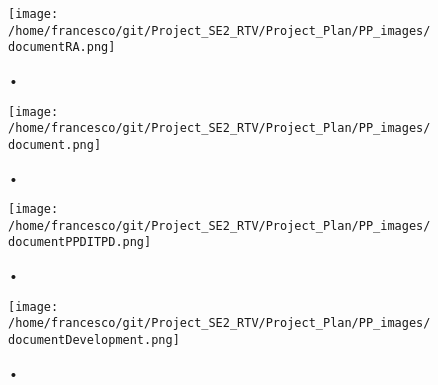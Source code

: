 \documentclass[10pt, a4paper,titlepage]{article}
\begin{document}
\pagebreak
\begin{figure}[h]
\begin{center}
\texttt{[image: /home/francesco/git/Project\_SE2\_RTV/Project\_Plan/PP\_images/documentRA.png]}
\label{fig:RASD}
\end{center}•
\end{figure}
\begin{figure}[h]
\begin{center}
\texttt{[image: /home/francesco/git/Project\_SE2\_RTV/Project\_Plan/PP\_images/document.png]}
\label{fig:DD}
\end{center}•
\end{figure}
\begin{figure}[h]
\begin{center}
\texttt{[image: /home/francesco/git/Project\_SE2\_RTV/Project\_Plan/PP\_images/documentPPDITPD.png]}
\label{fig:PPDITPD}
\end{center}•
\end{figure}
\begin{figure}[h]
\begin{center}
\texttt{[image: /home/francesco/git/Project\_SE2\_RTV/Project\_Plan/PP\_images/documentDevelopment.png]}
\label{fig:DEV}
\end{center}•
\end{figure}
\clearpage
\end{document}

